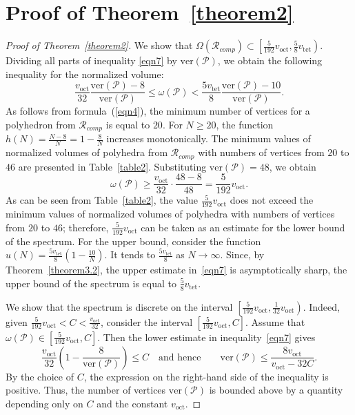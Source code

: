 \documentclass{amsart}
\newcommand{\voct}{v_{\mathrm{oct}}}
\newcommand{\vtet}{v_{\mathrm{tet}}}
\newcommand{\ver}{\mathrm{ver}}
\begin{document}
\section{Proof of Theorem~\ref{theorem2}} \label{main-compact}

\begin{proof}[Proof of Theorem~\ref{theorem2}]	
	We show that $\Omega(\mathcal R_{comp}) \subset \left[ \frac{5}{192} \voct, \frac{5}{8} \vtet \right)$.
	Dividing all parts of inequality \eqref{eqn7} by $\ver(\mathcal P)$, we obtain the following inequality for the normalized volume:
	$$
	\frac{\voct}{32} \frac{\ver(\mathcal P)-8}{\ver(\mathcal P)} \leq \omega(\mathcal P) < \frac{5\vtet}{8} \frac{\ver(\mathcal P)-10}{\ver(\mathcal P)}.
	$$
	As follows from formula~(\ref{eqn4}), the minimum number of vertices for a polyhedron from $\mathcal{R}_{comp}$ is equal to $20$.
	For $N \geq 20$, the function $h(N) = \frac{N-8}{N} = 1 - \frac{8}{N}$ increases monotonically.
	The minimum values of normalized volumes of polyhedra from $\mathcal{R}_{comp}$ with numbers of vertices from $20$ to $46$ are presented in Table~\ref{table2}.
	Substituting $\ver(\mathcal P)=48$, we obtain
	$$
	\omega(\mathcal P) \geq \frac{\voct}{32} \cdot \frac{48-8}{48} = \frac{5}{192} \voct.
	$$
	As can be seen from Table~\ref{table2}, the value $\frac{5}{192} \voct$ does not exceed the minimum values of normalized volumes of polyhedra with numbers of vertices from $20$ to $46$; therefore, $\frac{5}{192} \voct$ can be taken as an estimate for the lower bound of the spectrum.
	For the upper bound, consider the function $u(N) = \frac{5\vtet}{8} (1 - \frac{10}{N})$. It tends to $\frac{5\vtet}{8}$ as $N \to \infty$.
	Since, by Theorem~\ref{theorem3.2}, the upper estimate in~\eqref{eqn7} is asymptotically sharp, the upper bound of the spectrum is equal to $\frac{5}{8} \vtet$.

	We show that the spectrum is discrete on the interval $\left[ \frac{5}{192} \voct, \frac{1}{32} \voct \right)$.
	Indeed, given $\frac{5}{192} \voct < C < \frac{\voct}{32}$, consider the interval $[\frac{5}{192} \voct, C]$.
	Assume that $\omega(\mathcal P) \in [ \frac{5}{192} \voct, C]$. Then the lower estimate in inequality~\eqref{eqn7} gives
	$$
	\frac{\voct}{32} \left( 1 - \frac{8}{\ver(\mathcal P)} \right) \leq C \quad \text{and hence} \qquad \ver(\mathcal P) \leq \frac{8 \voct}{\voct - 32C} .
	$$
	By the choice of $C$, the expression on the right-hand side of the inequality is positive.
	Thus, the number of vertices $\ver(\mathcal P)$ is bounded above by a quantity depending only on $C$ and the constant $\voct$.


\end{proof}
\end{document}
